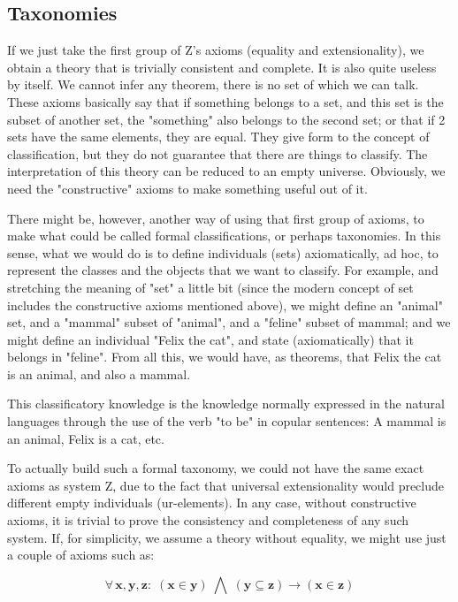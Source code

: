 \documentclass{IOS-Book-Article}     %
\begin{document}
\subsection{Taxonomies}
If we just take the first group of Z's axioms (equality and extensionality),
we obtain a theory that is trivially consistent and complete. It is also
quite useless by itself. We cannot infer any theorem, there is no set of which
we can talk. These axioms basically say that if something belongs to a set,
and this set is the subset of another set, the "something" also belongs to the
second set; or that if 2 sets have the same elements, they are equal.  They
give form to the concept of classification, but they do not guarantee that
there are things to classify.  The interpretation of this theory can be reduced
to an empty universe. Obviously, we need the "constructive" axioms to make
something useful out of it.

There might be, however, another way of using that first group of axioms,
to make what could be called formal classifications, or perhaps taxonomies.
In this sense, what we would do is to define individuals (sets) axiomatically,
ad hoc, to represent the classes and the objects that we want to classify.
For example, and stretching the meaning of "set" a little bit (since the
modern concept of set includes the constructive axioms mentioned above),
we might define an "animal" set, and a "mammal" subset of "animal",
and a "feline" subset of mammal; and we might define an individual
"Felix the cat", and state (axiomatically) that it belongs in "feline".
From all this, we would have, as theorems, that Felix the cat is an animal,
and also a mammal.

This classificatory knowledge is the knowledge normally expressed
in the natural languages through the use of the verb "to be" in
copular sentences: A mammal is an animal, Felix is a cat, etc.

To actually build such a formal taxonomy, we could not have the same exact
axioms as system Z, due to the fact that universal extensionality would
preclude different empty individuals (ur-elements). In any case, without
constructive axioms, it is trivial to prove the consistency and completeness
of any such system. If, for simplicity, we assume a theory without equality,
we might use just a couple of axioms such as:

\begin{equation}
\forall\,\mathbf{x\mathrm{,\mathbf{y\mathrm{,\mathbf{z}:\;\left(\mathbf{x\in y}\right)\;\bigwedge\;\left(\mathbf{y\subseteq\mathbf{z}}\right)\rightarrow\left(\mathbf{x\in\mathbf{z}}\right)}}}}
\end{equation}
\end{document}
